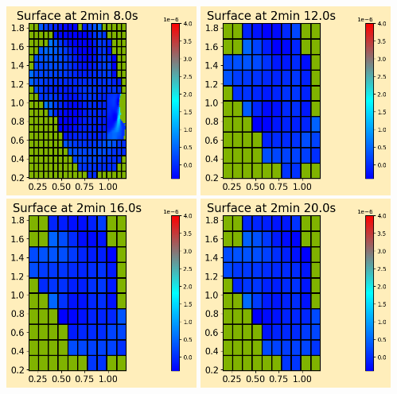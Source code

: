 \documentclass[11pt]{article}
\begin{document}
\vskip 10pt 
\includegraphics[width=0.475\textwidth]{frame0032fig0.png}
\vskip 10pt 
\includegraphics[width=0.475\textwidth]{frame0033fig0.png}
\vskip 10pt 
\includegraphics[width=0.475\textwidth]{frame0034fig0.png}
\vskip 10pt 
\includegraphics[width=0.475\textwidth]{frame0035fig0.png}
\end{document}
